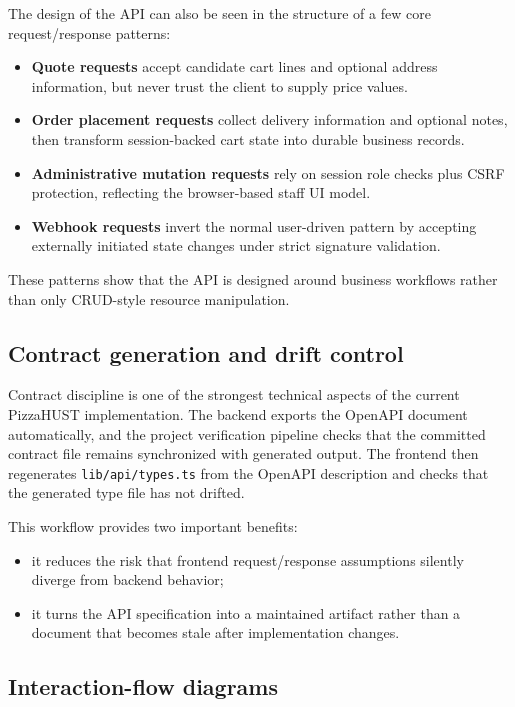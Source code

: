 The design of the API can also be seen in the structure of a few core request/response patterns:

\begin{itemize}
    \item \textbf{Quote requests} accept candidate cart lines and optional address information, but never trust the client to supply price values.
    \item \textbf{Order placement requests} collect delivery information and optional notes, then transform session-backed cart state into durable business records.
    \item \textbf{Administrative mutation requests} rely on session role checks plus CSRF protection, reflecting the browser-based staff UI model.
    \item \textbf{Webhook requests} invert the normal user-driven pattern by accepting externally initiated state changes under strict signature validation.
\end{itemize}

These patterns show that the API is designed around business workflows rather than only CRUD-style resource manipulation.

\subsection{Contract generation and drift control}

Contract discipline is one of the strongest technical aspects of the current PizzaHUST implementation. The backend exports the OpenAPI document automatically, and the project verification pipeline checks that the committed contract file remains synchronized with generated output. The frontend then regenerates \texttt{lib/api/types.ts} from the OpenAPI description and checks that the generated type file has not drifted.

This workflow provides two important benefits:

\begin{itemize}
    \item it reduces the risk that frontend request/response assumptions silently diverge from backend behavior;
    \item it turns the API specification into a maintained artifact rather than a document that becomes stale after implementation changes.
\end{itemize}

\subsection{Interaction-flow diagrams}

